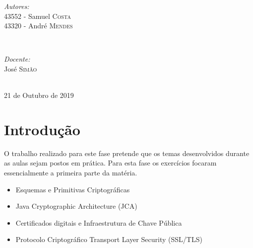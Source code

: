 \documentclass[11pt]{report}
\begin{document}
\begin{titlepage}
\vskip 70pt
\begin{minipage}{0.4\textwidth}
\begin{flushleft} \large
\emph{Autores:}\\
43552 - Samuel \textsc{Costa}\\
43320 - André \textsc{Mendes}
\end{flushleft}
\end{minipage}
~
\begin{minipage}{0.4\textwidth}
\begin{flushright} \large
\emph{Docente:} \\
José \textsc{Simão}\\
\end{flushright}
\end{minipage}\\[3cm]


{\large 21 de Outubro de 2019}\\[3cm] %


\vfill %

\end{titlepage}


\renewcommand\thesection{\arabic{section}}

\tableofcontents


\newpage


\section{Introdução}
O trabalho realizado para este fase pretende que os temas desenvolvidos durante as aulas sejam postos em prática. Para esta fase os exercícios focaram essencialmente a primeira parte da matéria.\\

\begin{itemize}
  \item Esquemas e Primitivas Criptográficas
  \item Java Cryptographic Architecture (JCA)
  \item Certificados digitais e Infraestrutura de Chave Pública
  \item Protocolo Criptográfico Transport Layer Security (SSL/TLS)
\end{itemize}
\end{document}
